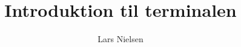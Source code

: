 \usepackage[utf8]{inputenc}                                  %
\usepackage[danish]{babel}										%

\usepackage{color}													%
\usepackage{parskip} 												%
\usepackage{listings}


\makeatletter
\def\@makechapterhead#1{%
  \vspace*{50\p@}%
  {\parindent \z@ \raggedright \normalfont
    \interlinepenalty\@M
    \Huge \bfseries #1\par\nobreak
    \vskip 40\p@
  }}
  \makeatother


\author{Lars Nielsen}
\title{Introduktion til terminalen}